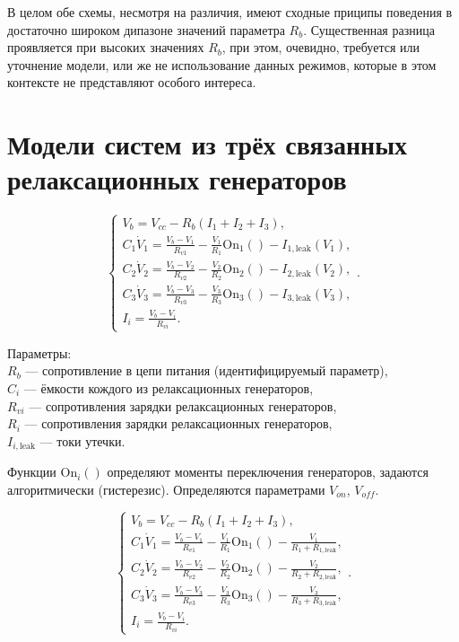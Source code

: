 В целом обе схемы, несмотря на различия, имеют сходные приципы поведения
в достаточно широком дипазоне значений параметра $R_b$.
Существенная разница проявляется при высоких значениях $R_b$,
при этом, очевидно, требуется или уточнение модели, или же
не использование данных режимов, которые в этом контексте не представляют
особого интереса.



\section{Модели систем из трёх связанных релаксационных генераторов}

\begin{equation}
  \begin{cases}
    V_b = V_{cc} - R_b ( I_1 + I_2 + I_3 ), \\
      C_1 \dot{V}_1 = \frac{V_b-V_1}{R_{v1}} - \frac{V_1}{R_1} \mathrm{On}_1() - I_{1,\mathrm{leak}}(V_1), \\
      C_2 \dot{V}_2 = \frac{V_b-V_2}{R_{v2}} - \frac{V_2}{R_2} \mathrm{On}_2() - I_{2,\mathrm{leak}}(V_2), \\
      C_3 \dot{V}_3 = \frac{V_b-V_3}{R_{v3}} - \frac{V_3}{R_3} \mathrm{On}_3() - I_{3,\mathrm{leak}}(V_3), \\
      I_i = \frac{V_b-V_i}{R_{vi}}.
  \end{cases}.
    \label{atu:eq:relax3}
\end{equation}

Параметры: \\
$R_b$ --- сопротивление в цепи питания (идентифицируемый параметр), \\
$C_i$ --- ёмкости кождого из релаксационных генераторов, \\
$R_{vi}$ --- сопротивления зарядки релаксационных генераторов, \\
$R_{i}$ --- сопротивления зарядки релаксационных генераторов, \\
$I_{i,\mathrm{leak}}$ --- токи утечки.

Функции $ \mathrm{On}_i() $ определяют моменты переключения генераторов,
задаются алгоритмически (гистерезис). Определяются параметрами
$V_{on}$, $V_{off}$.

\begin{equation}
  \begin{cases}
    V_b = V_{cc} - R_b ( I_1 + I_2 + I_3 ), \\
      C_1 \dot{V}_1 = \frac{V_b-V_1}{R_{v1}} - \frac{V_1}{R_1} \mathrm{On}_1() - \frac{V_1}{R_1+R_{1,\mathrm{leak}}}, \\
      C_2 \dot{V}_2 = \frac{V_b-V_2}{R_{v2}} - \frac{V_2}{R_2} \mathrm{On}_2() - \frac{V_2}{R_2+R_{2,\mathrm{leak}}}, \\
      C_3 \dot{V}_3 = \frac{V_b-V_3}{R_{v3}} - \frac{V_3}{R_3} \mathrm{On}_3() - \frac{V_3}{R_3+R_{3,\mathrm{leak}}}, \\
      I_i = \frac{V_b-V_i}{R_{vi}}.
  \end{cases}.
    \label{atu:eq:relax3_linleak}
\end{equation}

